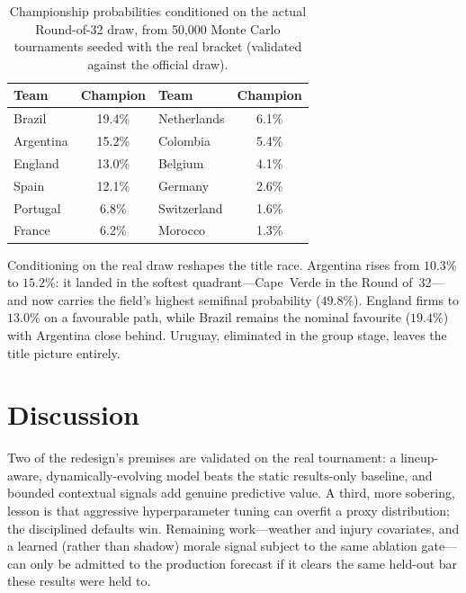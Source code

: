 \documentclass[11pt]{article}
\begin{document}
\begin{table}[h]\centering
\begin{tabular}{lc@{\qquad}lc}
\toprule
Team & Champion & Team & Champion \\
\midrule
Brazil    & 19.4\% & Netherlands & 6.1\% \\
Argentina & 15.2\% & Colombia    & 5.4\% \\
England   & 13.0\% & Belgium     & 4.1\% \\
Spain     & 12.1\% & Germany     & 2.6\% \\
Portugal  & 6.8\%  & Switzerland & 1.6\% \\
France    & 6.2\%  & Morocco     & 1.3\% \\
\bottomrule
\end{tabular}
\caption{Championship probabilities conditioned on the actual Round-of-32 draw,
from 50{,}000 Monte Carlo tournaments seeded with the real bracket (validated
against the official draw).}\label{tab:conditioned}
\end{table}

Conditioning on the real draw reshapes the title race. Argentina rises from
$10.3\%$ to $15.2\%$: it landed in the softest quadrant---Cape~Verde in the Round
of~32---and now carries the field's highest semifinal probability ($49.8\%$).
England firms to $13.0\%$ on a favourable path, while Brazil remains the nominal
favourite ($19.4\%$) with Argentina close behind. Uruguay, eliminated in the
group stage, leaves the title picture entirely.

\section{Discussion}
Two of the redesign's premises are validated on the real tournament: a
lineup-aware, dynamically-evolving model beats the static results-only baseline,
and bounded contextual signals add genuine predictive value. A third, more
sobering, lesson is that aggressive hyperparameter tuning can overfit a proxy
distribution; the disciplined defaults win. Remaining work---weather and injury
covariates, and a learned (rather than shadow) morale signal subject to the same
ablation gate---can only be admitted to the production forecast if it clears the
same held-out bar these results were held to.



\end{document}
